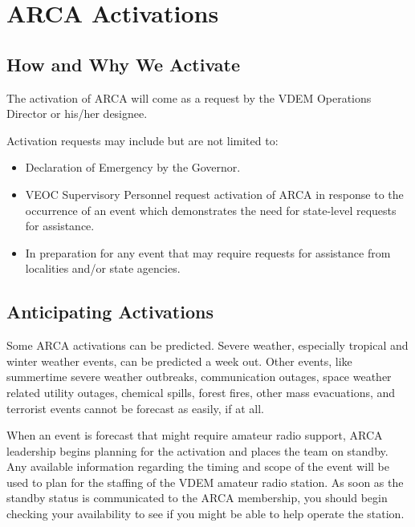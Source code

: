 \documentclass[pdflatex,letterpaper,twoside,12pt]{book}
\begin{document}
\chapter{ARCA Activations}

\section{How and Why We Activate}

The activation of ARCA will come as a request by the VDEM Operations Director or his/her designee.

Activation requests may include but are not limited to:

\begin{itemize}
	\item Declaration of Emergency by the Governor.
	\item VEOC Supervisory Personnel request activation of ARCA in response to the occurrence of an event which demonstrates the need for state-level requests for assistance.
	\item In preparation for any event that may require requests for assistance from localities and/or state agencies.
\end{itemize}


\section{Anticipating Activations}

Some ARCA activations can be predicted.  Severe weather, especially tropical and winter weather events, can be predicted a week out.  Other events, like summertime severe weather outbreaks, communication outages, space weather related utility outages, chemical spills, forest fires, other mass evacuations, and terrorist events cannot be forecast as easily, if at all.

When an event is forecast that might require amateur radio support, ARCA leadership begins planning for the activation and places the team on standby.  Any available information regarding the timing and scope of the event will be used to plan for the staffing of the VDEM amateur radio station.  As soon as the standby status is communicated to the ARCA membership, you should begin checking your availability to see if you might be able to help operate the station.
\end{document}
